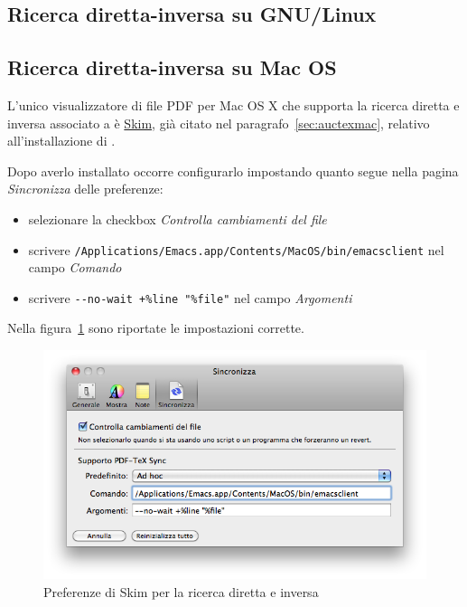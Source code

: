 \documentclass[11pt,a4paper]{article}
\begin{document}
\subsection{Ricerca diretta-inversa su GNU/Linux}
\label{sec:fislinux}

\textcolor{red}{\lipsum[1]}

\subsection{Ricerca diretta-inversa su Mac OS}
\label{sec:fismac}

L'unico visualizzatore di file PDF per Mac OS X che supporta la
ricerca diretta e inversa associato a \emacs{} è
\href{http://skim-app.sourceforge.net/}{Skim}, già citato nel
paragrafo~\ref{sec:auctexmac}, relativo all'installazione di
\auctex{}.

Dopo averlo installato occorre configurarlo impostando quanto segue
nella pagina \emph{Sincronizza} delle preferenze:
\begin{itemize}
\item selezionare la checkbox \emph{Controlla cambiamenti del file}
\item scrivere
  \verb!/Applications/Emacs.app/Contents/MacOS/bin/emacsclient!  nel
  campo \emph{Comando}
\item scrivere \verb!--no-wait +%line "%file"! nel campo
  \emph{Argomenti}
\end{itemize}
Nella figura~\ref{fig:skimpref} sono riportate le impostazioni
corrette.
\begin{figure}[tb]
  \centering
  \includegraphics[width=\textwidth]{preferenze-Skim}
  \caption{Preferenze di Skim per la ricerca diretta e inversa}
  \label{fig:skimpref}
\end{figure}
\end{document}
